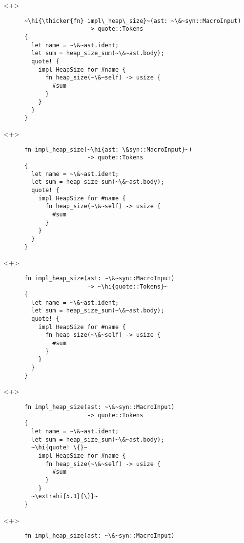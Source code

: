 \documentclass[usepdftitle=false]{beamer}
\renewcommand{\&}{\makebox[\widthof{\ampersand}][c]{\scalebox{0.9}[1.0]{\Book\ampersand}}}
\newcommand{\+}{\makebox[\widthof{+}][c]{\raisebox{-.2\height}{\scalefont{1.5}\Light+}}}
\newcommand{\thicker}[1]{\contourlength{0.26pt}\contour[10]{black}{#1}}
\newcommand{\hi}[1]{%
\tikz[baseline=(A.base)]
 \node[highlighting=0,inner sep=0pt,text depth=0pt] (A) {#1};%
}
\newcommand{\extrahi}[2]{%
\tikz[baseline=(A.base)]
  \node[highlighting=#1,inner sep=0pt,text depth=0pt] (A) {#2};%
}
\begin{document}
\begin{frame}[fragile]
  \begin{onlyenv}<+>
    \begin{verbatim}
      ~\hi{\thicker{fn} impl\_heap\_size}~(ast: ~\&~syn::MacroInput)
                        -> quote::Tokens
      {
        let name = ~\&~ast.ident;
        let sum = heap_size_sum(~\&~ast.body);
        quote! {
          impl HeapSize for #name {
            fn heap_size(~\&~self) -> usize {
              #sum
            }
          }
        }
      }
    \end{verbatim}
  \end{onlyenv}
  \begin{onlyenv}<+>
    \begin{verbatim}
      fn impl_heap_size(~\hi{ast: \&syn::MacroInput}~)
                        -> quote::Tokens
      {
        let name = ~\&~ast.ident;
        let sum = heap_size_sum(~\&~ast.body);
        quote! {
          impl HeapSize for #name {
            fn heap_size(~\&~self) -> usize {
              #sum
            }
          }
        }
      }
    \end{verbatim}
  \end{onlyenv}
  \begin{onlyenv}<+>
    \begin{verbatim}
      fn impl_heap_size(ast: ~\&~syn::MacroInput)
                        -> ~\hi{quote::Tokens}~
      {
        let name = ~\&~ast.ident;
        let sum = heap_size_sum(~\&~ast.body);
        quote! {
          impl HeapSize for #name {
            fn heap_size(~\&~self) -> usize {
              #sum
            }
          }
        }
      }
    \end{verbatim}
  \end{onlyenv}
  \begin{onlyenv}<+>
    \begin{verbatim}
      fn impl_heap_size(ast: ~\&~syn::MacroInput)
                        -> quote::Tokens
      {
        let name = ~\&~ast.ident;
        let sum = heap_size_sum(~\&~ast.body);
        ~\hi{quote! \{}~
          impl HeapSize for #name {
            fn heap_size(~\&~self) -> usize {
              #sum
            }
          }
        ~\extrahi{5.1}{\}}~
      }
    \end{verbatim}
  \end{onlyenv}
  \begin{onlyenv}<+>
    \begin{verbatim}
      fn impl_heap_size(ast: ~\&~syn::MacroInput)

\end{verbatim}
\end{onlyenv}
\end{frame}
\end{document}
